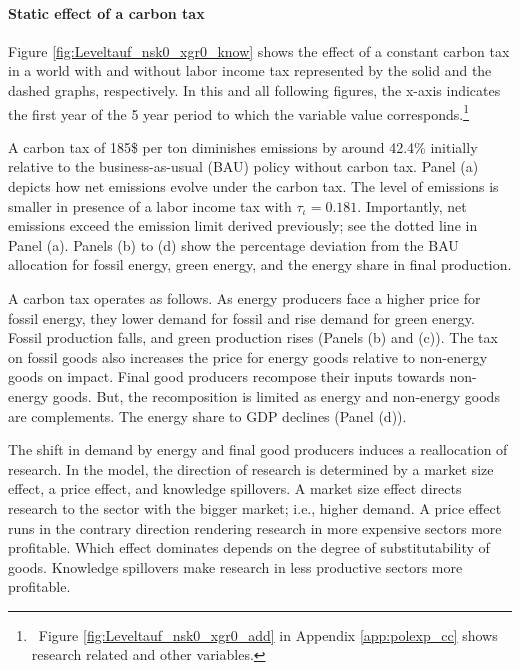 \begin{figure}[h!!]
\end{figure} 

\paragraph{Static effect of a carbon tax}
 Figure \ref{fig:Leveltauf_nsk0_xgr0_know} shows the effect of a constant carbon tax in a world with and without labor income tax represented by the solid and the dashed graphs, respectively. In this and all following figures, the x-axis indicates the first year of the 5 year period to which the variable value corresponds.\footnote{\ Figure \ref{fig:Leveltauf_nsk0_xgr0_add} in Appendix \ref{app:polexp_cc} shows research related and other variables.}  
 
 A carbon tax of 185\$ per ton diminishes emissions by around 42.4\% initially relative to the business-as-usual (BAU) policy without carbon tax.
 Panel (a) depicts how net emissions evolve under the carbon tax. The level of emissions is smaller in presence of a labor income tax with $\tau_{\iota}=0.181$. Importantly, net emissions exceed the emission limit  derived previously; see the dotted line in Panel (a). Panels (b) to (d) show the percentage deviation from the BAU allocation for fossil energy, green energy, and the energy share in final production. 
 
A carbon tax operates as follows. As energy producers face a higher price for fossil energy, they lower demand for fossil and rise demand for green energy. Fossil production falls, and green production rises (Panels (b) and (c)).
 The tax on fossil goods also increases the price for energy goods relative to non-energy goods on impact. Final good producers recompose their inputs towards non-energy goods. But, the recomposition is limited as energy and non-energy goods are complements. The energy share to GDP declines (Panel (d)).  
 
 The shift in demand by energy and final good producers induces a reallocation of research. In the model, the direction of research is determined by a market size effect, a price effect, and knowledge spillovers. 
 A market size effect directs research to the sector with the bigger market; i.e., higher demand. A price effect runs in the contrary direction rendering research in more expensive sectors more profitable. Which effect dominates depends on the degree of substitutability of goods. Knowledge spillovers make research in less productive sectors more profitable.
 
